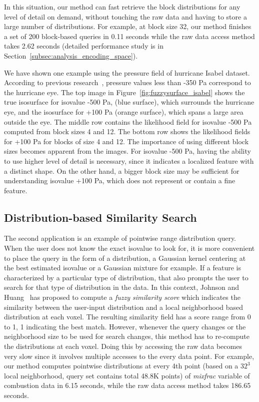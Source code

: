 In this situation, our method can fast retrieve the block distributions for any level of detail on demand, without touching the raw data and having to store a large number of distributions. For example, at block size 32, our method finishes a set of 200 block-based queries in 0.11 seconds while the raw data access method takes 2.62 seconds (detailed performance study is in Section~\ref{subsec:analysis_encoding_space}). 

We have shown one example using the pressure field of hurricane Isabel dataset. According to previous research~\cite{qdv11}, pressure values less than -350 Pa correspond to the hurricane eye. The top image in Figure~\ref{fig:fuzzysurface_isabel} shows the  true isosurface for isovalue -500 Pa, (blue surface), which surrounds the hurricane eye, and the isosurface for +100 Pa (orange surface), which spans a large area outside the eye. The middle row contains the likelihood field for isovalue -500 Pa computed from block sizes 4 and 12. The bottom row shows the likelihood fields for +100 Pa for blocks of size 4 and 12. The importance of using different block sizes becomes apparent from the images. For isovalue -500 Pa, having the ability to use higher level of detail is necessary, since it indicates a localized feature with a distinct shape. On the other hand, a bigger block size may be sufficient for understanding isovalue +100 Pa, which does not represent or contain a fine feature. 
\subsection{Distribution-based Similarity Search}
\label{sec:application_2}
The second application is an example of pointwise range distribution query. When the user does not know the exact isovalue to look for, it is more convenient to place the query in the form of a distribution, a Gaussian kernel centering at the best estimated isovalue or a Gaussian mixture for example. If a feature is characterized by a particular type of distribution, that also prompts the user to search for that type of distribution in the data. In this context, Johnson and Huang~\cite{johnson09} has proposed to compute a \emph{fuzzy similarity score} which indicates the similarity between the user-input distribution and a local neighborhood based distribution at each voxel. The resulting similarity field has a score range from 0 to 1, 1 indicating the best match. However, whenever the query changes or the neighborhood size to be used for search changes, this method has to re-compute the distributions at each voxel. Doing this by accessing the raw data becomes very slow since it involves multiple accesses to the every data point. For example, our method computes pointwise distributions at every 4th point (based on a $32^3$ local neighborhood, query set contains total 48.8K points) of \emph{mixfrac} variable of combustion data in 6.15 seconds, while the raw data access method takes 186.65 seconds. 


